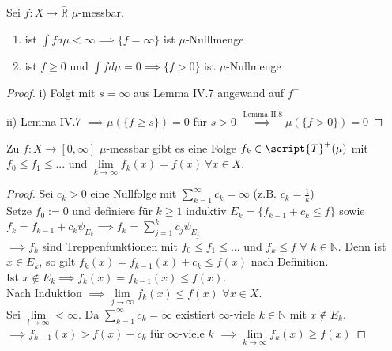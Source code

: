   \begin{lemma}
    Sei $f: X \to \bar{\mathbb{R}}$ $\mu$-messbar.
    \begin{enumerate}[label=\roman*)]
      \item ist $\int f d\mu < \infty \implies \{f = \infty\}$ ist $\mu$-Nulllmenge
      \item ist $f \geq 0$ und $\int f d\mu = 0 \implies \{f > 0\}$ ist $\mu$-Nullmenge
    \end{enumerate}
  \end{lemma}

  \begin{proof}
    \item[i)] Folgt mit $s=\infty$ aus Lemma IV.7 angewand auf $f^+$
    \item[ii)] Lemma IV.7 $\implies \mu(\{f\geq s\})=0$ für $s>0$ $\overset{\text{Lemma II.8}}{\implies} \mu(\{f >0\})=0$
  \end{proof}

  \begin{theorem}
    Zu $f: X \to [0,\infty]$ $\mu$-messbar gibt es eine Folge $f_k \in \script{T}^+(\mu)$ mit $f_0 \leq f_1 \leq ...$ und $\lim\limits_{k \to \infty} f_k(x) = f(x) \ \forall x \in X$.
  \end{theorem}

  \begin{proof}
    Sei $c_k > 0$ eine Nullfolge mit $\sum\limits_{k=1}^\infty c_k = \infty$ (z.B. $c_k = \frac{1}{k}$) \\
    Setze $f_0 := 0$ und definiere für $k\geq 1$ induktiv $E_k = \{f_{k-1}+c_k \leq f  \}$ sowie  \\ $f_k = f_{k-1}+c_k\psi_{E_k} \implies f_k = \sum\limits_{j=1}^k c_j\psi_{E_j}$ \\
    $\implies f_k$ sind Treppenfunktionen mit $f_0 \leq f_1 \leq ...$ und $f_k \leq f$ $\forall$ $k\in\mathbb{N}$. Denn ist $x\in E_k$, so gilt $f_k(x) = f_{k-1}(x)+c_k \leq f(x)$ nach Definition. \\
    Ist $x \notin E_k \implies f_k(x) = f_{k-1}(x) \leq f(x)$. \\
    Nach Induktion $\implies \lim\limits_{j\to\infty} f_k(x) \leq f(x)$ $\forall x\in X$. \\
    Sei $\lim\limits_{l\to\infty} < \infty $. Da $\sum\limits_{k=1}^\infty c_k = \infty$ existiert $\infty$-viele $k\in\mathbb{N}$ mit $x\notin E_k$. \\
    $\implies f_{k-1}(x) > f(x)-c_k$  für $\infty$-viele $k$ $\implies \lim\limits_{k\to\infty}f_k(x) \geq f(x)$
  \end{proof}

